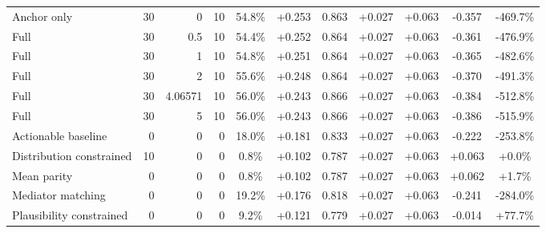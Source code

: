 \begin{table}[htbp]
\begin{tabular}{lrrrccccccc}
Anchor only & 30 & 0 & 10 & 54.8\% & +0.253 & 0.863 & +0.027 & +0.063 & -0.357 & -469.7\% \\
Full & 30 & 0.5 & 10 & 54.4\% & +0.252 & 0.864 & +0.027 & +0.063 & -0.361 & -476.9\% \\
Full & 30 & 1 & 10 & 54.8\% & +0.251 & 0.864 & +0.027 & +0.063 & -0.365 & -482.6\% \\
Full & 30 & 2 & 10 & 55.6\% & +0.248 & 0.864 & +0.027 & +0.063 & -0.370 & -491.3\% \\
Full & 30 & 4.06571 & 10 & 56.0\% & +0.243 & 0.866 & +0.027 & +0.063 & -0.384 & -512.8\% \\
Full & 30 & 5 & 10 & 56.0\% & +0.243 & 0.866 & +0.027 & +0.063 & -0.386 & -515.9\% \\
Actionable baseline & 0 & 0 & 0 & 18.0\% & +0.181 & 0.833 & +0.027 & +0.063 & -0.222 & -253.8\% \\
Distribution constrained & 10 & 0 & 0 & 0.8\% & +0.102 & 0.787 & +0.027 & +0.063 & +0.063 & +0.0\% \\
Mean parity & 0 & 0 & 0 & 0.8\% & +0.102 & 0.787 & +0.027 & +0.063 & +0.062 & +1.7\% \\
Mediator matching & 0 & 0 & 0 & 19.2\% & +0.176 & 0.818 & +0.027 & +0.063 & -0.241 & -284.0\% \\
Plausibility constrained & 0 & 0 & 0 & 9.2\% & +0.121 & 0.779 & +0.027 & +0.063 & -0.014 & +77.7\% \\
\bottomrule
\end{tabular}
\end{table}